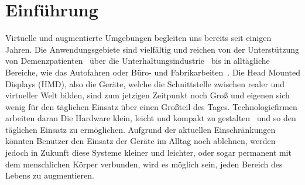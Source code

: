 \chapter{Einführung}

Virtuelle und augmentierte Umgebungen begleiten uns bereits seit einigen Jahren. Die Anwendungsgebiete sind vielfältig und reichen von der Unterstützung von Demenzpatienten~\cite{flynn2003developing, hayhurst2018augmented} über die Unterhaltungsindustrie~\cite{hughes2005mixed} bis in alltägliche Bereiche, wie das Autofahren oder Büro- und Fabrikarbeiten~\cite{medenica2011augmented, caudell1992augmented}. 
Die Head Mounted Displays (HMD), also die Geräte, welche die Schnittstelle zwischen realer und virtueller Welt bilden, sind zum jetzigen Zeitpunkt noch Groß und eigenen sich wenig für den täglichen Einsatz über einen Großteil des Tages. Technologiefirmen arbeiten daran Die Hardware klein, leicht und kompakt zu gestalten~\cite{shibata2002head, sugihara2012head} und so den täglichen Einsatz zu ermöglichen.
Aufgrund der aktuellen Einschränkungen könnten Benutzer den Einsatz der Geräte im Alltag noch ablehnen, werden jedoch in Zukunft diese Systeme kleiner und leichter, oder sogar permanent mit dem menschlichen Körper verbunden, wird es möglich sein, jeden Bereich des Lebens zu augmentieren. 
